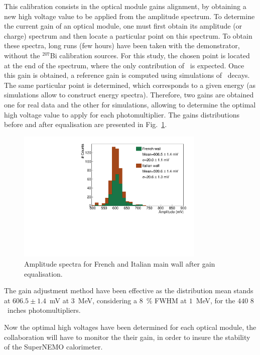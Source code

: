 This calibration consists in the optical module gains alignment, by obtaining a new high voltage value to be applied from the amplitude spectrum.
To determine the current gain of an optical module, one must first obtain its amplitude (or charge) spectrum and then locate a particular point on this spectrum.
To obtain these spectra, long runs (few hours) have been taken with the demonstrator, without the $^{207}$Bi calibration sources.
For this study, the chosen point is located at the end of the spectrum, where the only contribution of \Tl\ is expected.
Once this gain is obtained, a reference gain is computed using simulations of \Tl\ decays.
The same particular point is determined, which corresponds to a given energy (as simulations allow to construct energy spectra).
Therefore, two gains are obtained one for real data and the other for simulations, allowing to determine the optimal high voltage value to apply for each photomultiplier.
The gains distributions before and after equalisation are presented in Fig.~\ref{fig:Axel_gain}.
\begin{figure}[h!]
  \centering
  \includegraphics[width=0.8\textwidth]{commissioning/fig_commissioning/equal_gains_Axel.pdf}
  \caption{Amplitude spectra for French and Italian main wall after gain equalisation.
    \label{fig:Axel_gain}}
\end{figure}
The gain adjustment method have been effective as the distribution mean stands at $606.5\pm1.4$~mV at $3$~MeV, considering a $8$~\% FWHM at $1$~MeV, for the $440$ $8$~inches photomultipliers.

Now the optimal high voltages have been determined for each optical module, the collaboration will have to monitor the their gain, in order to insure the stability of the SuperNEMO calorimeter.



